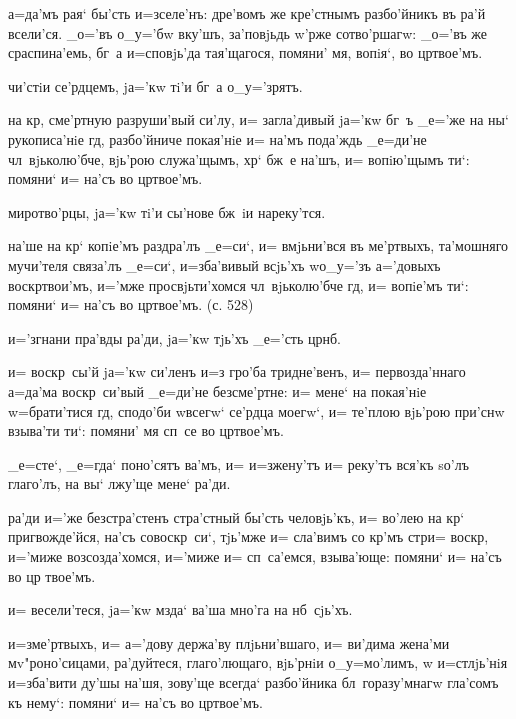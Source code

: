 
 а=да'мъ рая` бы'сть и=зселе'нъ: дре'вомъ 
же кре'стнымъ разбо'йникъ въ ра'й всели'ся. _о='въ 
о_у='бw вку'шъ, за'повjьдь w'рже сотво'ршагw: _о='въ 
же сраспина'емь, бг~а и=сповjь'да тая'щагося, помяни' мя, 
вопiя`, во цр твое'мъ.

  чи'стiи се'рдцемъ, jа='кw тi'и 
бг~а о_у='зрятъ.

 на кр, сме'ртную разруши'вый 
си'лу, и= загла'дивый jа='кw бг~ъ _е='же на ны` 
рукописа'нiе гд, разбо'йниче покая'нiе и= на'мъ 
пода'ждь _е=ди'не чл~вjьколю'бче, вjь'рою служа'щымъ, 
хр` бж~е на'шъ, и= вопiю'щымъ ти`: помяни` и= на'съ 
во цр твое'мъ.

  миротво'рцы, jа='кw тi'и сы'нове 
бж~iи нареку'тся.

 на'ше на кр` копiе'мъ раздра'лъ 
_е=си`, и= вмjьни'вся въ ме'ртвыхъ, та'мошняго мучи'теля 
связа'лъ _е=си`, и=зба'вивый всjь'хъ w\т о_у='зъ 
а='довыхъ воскр твои'мъ, и='мже просвjьти'хомся 
чл~вjьколю'бче гд, и= вопiе'мъ ти`: помяни` и= на'съ 
во цр твое'мъ. (с. 528)

  и='згнани пра'вды ра'ди, jа='кw 
тjь'хъ _е='сть цр нб.

 и= воскр~сы'й jа='кw си'ленъ и=з\ъ 
гро'ба тридне'венъ, и= первозда'ннаго а=да'ма 
воскр~си'вый _е=ди'не безсме'ртне: и= мене` на покая'нiе 
w=брати'тися гд, сподо'би w\т всегw` се'рдца моегw`, 
и= те'плою вjь'рою при'снw взыва'ти ти`: помяни' мя сп~се 
во цр твое'мъ.

  _е=сте`, _е=гда` поно'сятъ ва'мъ, 
и= и=зжену'тъ и= реку'тъ вся'къ sо'лъ глаго'лъ, на вы` 
лжу'ще мене` ра'ди.

 ра'ди и='же безстра'стенъ стра'стный бы'сть 
человjь'къ, и= во'лею на кр` пригвожде'йся, на'съ 
совоскр~си`, тjь'мже и= сла'вимъ со кр'мъ стр и= 
воскр, и='миже возсозда'хомся, и='миже и= 
сп~са'емся, взыва'юще: помяни` и= на'съ во цр 
твое'мъ.

  и= весели'теся, jа='кw мзда` 
ва'ша мно'га на нб~сjь'хъ.

 и=з\ъ ме'ртвыхъ, и= а='дову держа'ву 
плjьни'вшаго, и= ви'дима жена'ми мv"роно'сицами, 
ра'дуйтеся, глаго'лющаго, вjь'рнiи о_у=мо'лимъ, w\т 
и=стлjь'нiя и=зба'вити ду'шы на'шя, зову'ще всегда` 
разбо'йника бл~горазу'мнагw гла'сомъ къ нему`: помяни` и= 
на'съ во цр твое'мъ.

